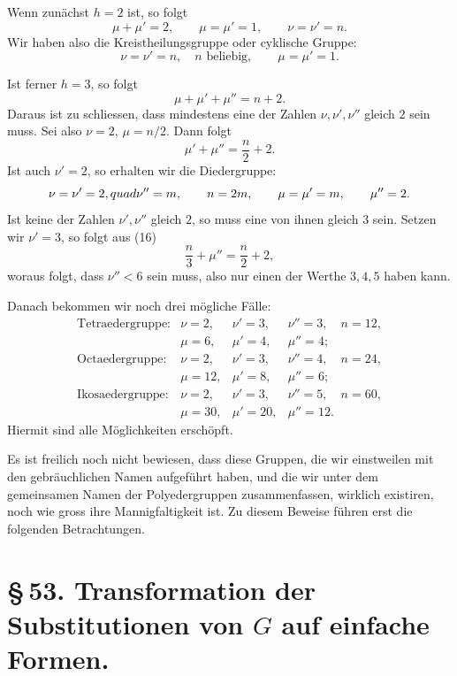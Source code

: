 \documentclass[11pt]{article}
\begin{document}
Wenn zunächst $h=2$ ist, so folgt
\[
\mu+\mu'=2,
\qquad
\mu=\mu'=1,
\qquad
\nu=\nu'=n.
\]
Wir haben also die Kreistheilungsgruppe oder cyklische Gruppe:
\[
\nu=\nu'=n,\quad n\text{ beliebig},\qquad \mu=\mu'=1.
\]

Ist ferner $h=3$, so folgt
\begin{equation}
\mu+\mu'+\mu''=n+2.
\tag{15}
\end{equation}
Daraus ist zu schliessen, dass mindestens eine der Zahlen $\nu,\nu',\nu''$ gleich $2$ sein muss. Sei also $\nu=2$, $\mu=n/2$. Dann folgt
\begin{equation}
\mu'+\mu''=\frac n2+2.
\tag{16}
\end{equation}
Ist auch $\nu'=2$, so erhalten wir die Diedergruppe:
\[
\nu=\nu'=2,\\quad \nu''=m,
\qquad n=2m,
\qquad \mu=\mu'=m,
\qquad \mu''=2.
\]
Ist keine der Zahlen $\nu',\nu''$ gleich $2$, so muss eine von ihnen gleich $3$ sein. Setzen wir $\nu'=3$, so folgt aus (16)
\begin{equation}
\frac n3+\mu''=\frac n2+2,
\tag{17}
\end{equation}
woraus folgt, dass $\nu''<6$ sein muss, also nur einen der Werthe $3,4,5$ haben kann.

Danach bekommen wir noch drei mögliche Fälle:
\[
\begin{array}{llll}
\text{Tetraedergruppe:}&\nu=2,&\nu'=3,&\nu''=3,\quad n=12,\\
&\mu=6,&\mu'=4,&\mu''=4;\\[0.3em]
\text{Octaedergruppe:}&\nu=2,&\nu'=3,&\nu''=4,\quad n=24,\\
&\mu=12,&\mu'=8,&\mu''=6;\\[0.3em]
\text{Ikosaedergruppe:}&\nu=2,&\nu'=3,&\nu''=5,\quad n=60,\\
&\mu=30,&\mu'=20,&\mu''=12.
\end{array}
\]
Hiermit sind alle Möglichkeiten erschöpft.

Es ist freilich noch nicht bewiesen, dass diese Gruppen, die wir einstweilen mit den gebräuchlichen Namen aufgeführt haben, und die wir unter dem gemeinsamen Namen der Polyedergruppen zusammenfassen, wirklich existiren, noch wie gross ihre Mannigfaltigkeit ist. Zu diesem Beweise führen erst die folgenden Betrachtungen.

\section*{\S\,53. Transformation der Substitutionen von $G$ auf einfache Formen.}
\end{document}
